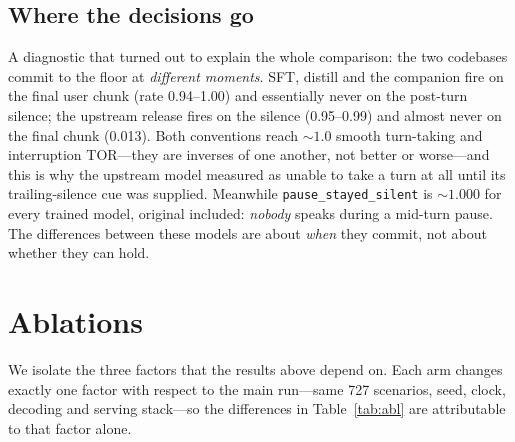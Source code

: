 \documentclass[conference]{IEEEtran}
\begin{document}
\subsection{Where the decisions go}
A diagnostic that turned out to explain the whole comparison: the two codebases
commit to the floor at \emph{different moments}. SFT, distill and the companion
fire on the final user chunk (rate 0.94--1.00) and essentially never on the
post-turn silence; the upstream release fires on the silence (0.95--0.99) and
almost never on the final chunk (0.013). Both conventions reach ${\sim}1.0$ smooth
turn-taking and interruption TOR---they are inverses of one another, not better or
worse---and this is why the upstream model measured as unable to take a turn at
all until its trailing-silence cue was supplied. Meanwhile
\texttt{pause\_stayed\_silent} is ${\sim}1.000$ for every trained model, original
included: \emph{nobody} speaks during a mid-turn pause. The differences between
these models are about \emph{when} they commit, not about whether they can hold.

\section{Ablations}
\label{sec:ablation}

We isolate the three factors that the results above depend on. Each arm changes
exactly one factor with respect to the main run---same 727 scenarios, seed, clock,
decoding and serving stack---so the differences in Table~\ref{tab:abl} are
attributable to that factor alone.
\end{document}
